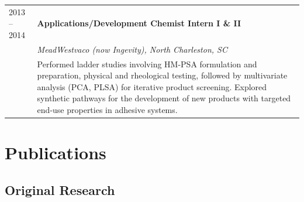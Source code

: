\documentclass[11pt, letterpaper]{article}
\makeatletter
\newcommand{\entry}[4]{%
  \noindent
  \begin{tabularx}{\linewidth}{@{}p{3.1cm}X@{}}
    \textcolor{light}{\small #1} &
    \textbf{#2} \\
    & \textit{#3} \\
    & #4
  \end{tabularx}
  \vspace{0.4em}
}
\makeatother
\begin{document}
\entry{2013 -- 2014}
  {Applications/Development Chemist Intern I \& II}
  {MeadWestvaco (now Ingevity), North Charleston, SC}
  {Performed ladder studies involving HM-PSA formulation and preparation, physical and rheological testing, followed by multivariate analysis (PCA, PLSA) for iterative product screening. \newline
   Explored synthetic pathways for the development of new products with targeted end-use properties in adhesive systems.}

\section{Publications}

\subsection{Original Research}
\end{document}
